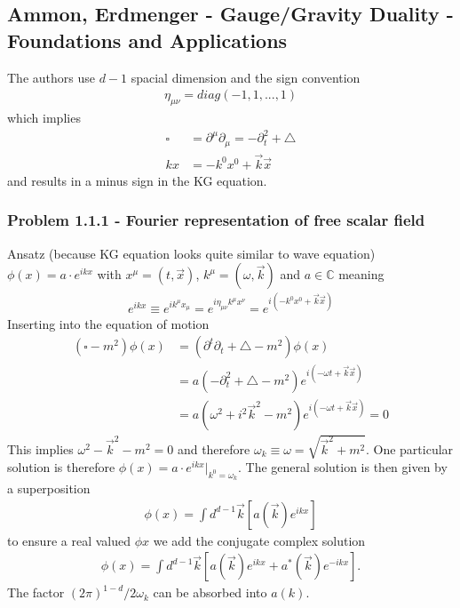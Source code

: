 \documentclass[10pt,a4paper]{book}
\theoremstyle{definition}
\begin{document}
\subsection{{\sc Ammon, Erdmenger} - Gauge/Gravity Duality - Foundations and Applications}
The authors use $d-1$ spacial dimension and the sign convention 
\begin{align}
\eta_{\mu\nu}=diag(-1,1,...,1)
\end{align}
which implies 
\begin{align}
    \square&=\partial^\mu\partial_\mu=-\partial_t^2+\triangle\\
    kx&=-k^0x^0+\vec{k}\vec{x}
\end{align}
and results in a minus sign in the KG equation.

\subsubsection{Problem 1.1.1 - Fourier representation of free scalar field}
Ansatz (because KG equation looks quite similar to wave equation) $\phi(x)=a\cdot e^{ikx}$ with $x^\mu=(t,\vec{x})$, $k^\mu=(\omega,\vec{k})$ and $a\in\mathbb{C}$ meaning 
\begin{align}
    e^{ikx}\equiv e^{ik^{\mu}x_{\mu}}=e^{i\eta_{\mu\nu}k^{\mu}x^{\nu}}=e^{i(-k^0x^0+\vec{k}\vec{x})}
\end{align}
Inserting into the equation of motion
\begin{align}
    (\square - m^2)\phi(x)&=(\partial^t\partial_t + \triangle - m^2)\phi(x)\\
    &=a(-\partial_t^2 + \triangle - m^2)e^{i(-\omega t+\vec{k}\vec{x})}\\
    &=a\left(\omega^2 + i^2\vec{k}^2 - m^2\right)e^{i(-\omega t+\vec{k}\vec{x})}=0 
\end{align}
This implies $\omega^2-\vec{k}^2-m^2=0$ and therefore $\omega_k\equiv\omega=\sqrt{\vec{k}^2+m^2}$. One particular solution is therefore $\phi(x)=a\cdot e^{ikx}|_{k^0=\omega_k}$. The general solution is then given by a superposition
\begin{align}
    \phi(x)=\int d^{d-1}\vec{k}\left[a(\vec{k})e^{ikx}\right]
\end{align}
to ensure a real valued $\phi{x}$ we add the conjugate complex solution
\begin{align}
    \phi(x)=\int d^{d-1}\vec{k}\left[a(\vec{k})e^{ikx} + a^*(\vec{k})e^{-ikx}\right].
\end{align}
The factor $(2\pi)^{1-d}/2\omega_k$ can be absorbed into $a(k)$.
\end{document}
